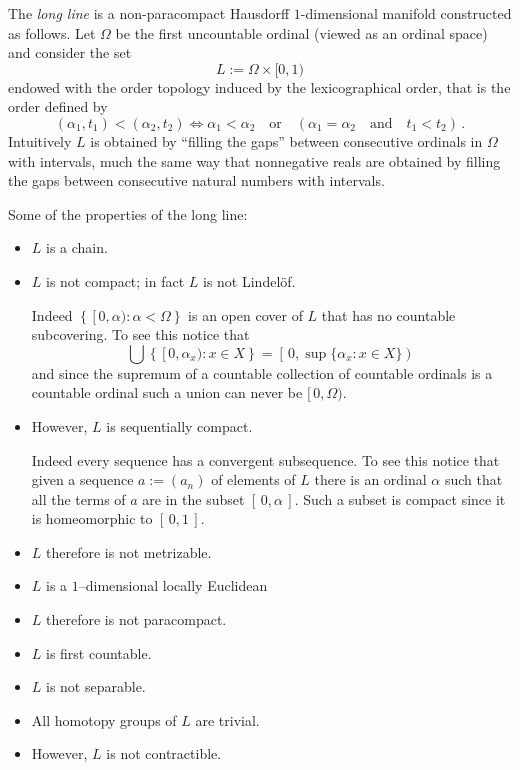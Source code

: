 \documentclass[12pt]{article}
\newcommand{\Ga}{\alpha}
\newcommand{\GW}{\Omega}
\begin{document}
The \emph{long line} is a non-paracompact Hausdorff $1$-dimensional manifold
 constructed as
follows. Let $\GW$ be the first uncountable ordinal (viewed as an ordinal space) and consider the set 
$$L:=\GW\times [0,1)$$
endowed with the order topology induced by the 
lexicographical order, that is the order defined by 
$$(\Ga_1,t_1) < (\Ga_2,t_2) \iff \Ga_1<\Ga_2 \quad\text{or}\quad
(\Ga_1=\Ga_2 \quad\text{and}\quad t_1<t_2)\,.$$
Intuitively $L$ is obtained by ``filling the gaps'' between consecutive
ordinals in $\GW$ with intervals, much the same way that 
nonnegative  reals are 
obtained by filling the gaps between consecutive natural numbers with intervals. 

Some of the  properties of the long line:
\begin{itemize}
\item $L$ is a chain.

\item $L$ is not compact; in fact $L$ is not Lindel\"of.

Indeed $\left\{\,[\,0,\Ga):\Ga<\GW\right\}$ is an open cover of $L$ that has no
countable subcovering. To see this notice that 
$$\bigcup\left\{\, [\,0,\Ga_x):x\in X\right\}=\left[\,0,\sup\{\Ga_x:x\in X\}\right)\,$$
 and since the supremum of a countable
collection of countable ordinals is a countable ordinal such a union can
 never be $[\,0,\GW)$.

 \item However, $L$ is sequentially compact.

Indeed every sequence has a convergent subsequence. To see this notice that
given a sequence $a:=(a_n)$ of elements of $L$ there is an ordinal $\Ga$ such
that all the terms of  $a$ are in the subset $[\,0,\Ga\,]$. Such a subset is
compact since it is homeomorphic to $[\,0,1\,]$.

\item $L$ therefore is not metrizable.

\item $L$ is a $1$--dimensional locally Euclidean

\item $L$ therefore is not paracompact.

\item $L$ is first countable.

\item $L$ is not separable.

\item All homotopy groups of $L$ are trivial.

\item However, $L$ is not contractible.
 
\end{itemize}
\end{document}

